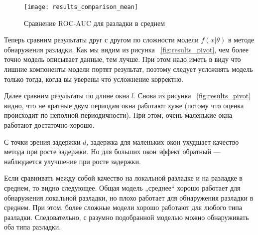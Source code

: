 \documentclass[%
12pt,
master,  %
natbib,      %
subf,        %
substylefile = spbu.rtx,
href,        %
colorlinks,  %
]{disser}
\begin{document}
\begin{figure}[!hhh]
	\begin{center}
		\texttt{[image: results\_comparison\_mean]}
	\end{center}
	\vspace{-5mm}\caption{Сравнение ROC-AUC для разладки в среднем}
	\label{fig:results_comparison_mean}
\end{figure}


Теперь сравним результаты друг с другом по сложности модели $f(x| \theta)$ в методе обнаружения разладки. Как мы видим из рисунка ~\ref{fig:results_pivot}, чем более точно модель описывает данные, тем лучше. При этом надо иметь в виду что лишние компоненты модели портят результат, поэтому следует усложнять модель только тогда, когда вы уверены что усложнение корректно.

Далее сравним результаты по длине окна $l$. Снова из рисунка ~\ref{fig:results_pivot} видно, что не кратные двум периодам окна работают хуже (потому что оценка происходит по неполной периодичности). При этом, очень маленькие окна работают достаточно хорошо.

С точки зрения задержки $d$, задержка для маленьких окон ухудшает качество метода при росте задержки. Но для больших окон эффект обратный --- наблюдается улучшение при росте задержки. 

Если сравнивать между собой качество на локальной разладке и на разладке в среднем, то видно следующее. Общая модель „среднее“ хорошо работает для обнаружения локальной разладки, но плохо работает для обнаружения разладки в среднем. При этом, более сложные модели хорошо работают для любого типа разладки. Следовательно, с разумно подобранной моделью можно обнаруживать оба типа разладки.
\end{document}
